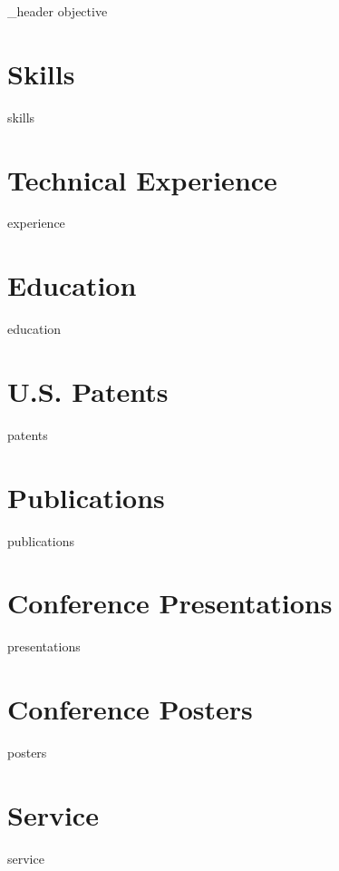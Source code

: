 \documentclass[letter,10pt]{article}
\author{Joelle Tori Maslak} %
\begin{document}
{_header}
{objective}

\raggedright

\section{Skills}
{skills}

\section{Technical Experience}
{experience}

\section{Education}
{education}

\section{U.S. Patents}
{patents}

\section{Publications}
{publications}

\section{Conference Presentations}
{presentations}

\pagebreak
\section{Conference Posters}
{posters}

\section{Service}
{service}
\end{document}
